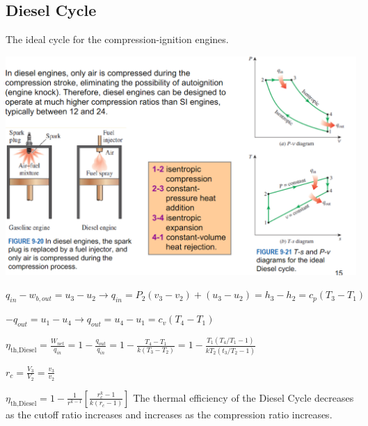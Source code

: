 \documentclass{article}
\begin{document}
\begin{multicols}{3}
    \subsection*{Diesel Cycle}
    The ideal cycle for the compression-ignition engines.\par 
    \includegraphics[width=\linewidth]{Images/Diesel_Cycle.png}\par 
    $q_{in}-w_{b,out}=u_3-u_2\rightarrow q_{in}=P_2(v_3-v_2)+(u_3-u_2)=h_3-h_2=c_p(T_3-T_1)$\par 
    $-q_{out}=u_1-u_4\rightarrow q_{out}=u_4-u_1=c_v(T_4-T_1)$\par 
    $\eta_\text{th,Diesel}=\frac{W_{net}}{q_{in}}=1-\frac{q_{out}}{q_{in}}=1-\frac{T_4-T_1}{k(T_3-T_2)}=1-\frac{T_1(T_4/T_1-1)}{kT_2(t_3/T_2-1)}$\par 
    $r_c=\frac{V_3}{V_2}=\frac{v_3}{v_2}$\par 
    $\eta_\text{th,Diesel}=1-\frac{1}{r^{k-1}}\left[\frac{r_c^k-1}{k(r_c-1)}\right]$
    The thermal efficiency of the Diesel Cycle decreases as the cutoff ratio increases and increases as the compression ratio increases.

\end{multicols}
\end{document}
